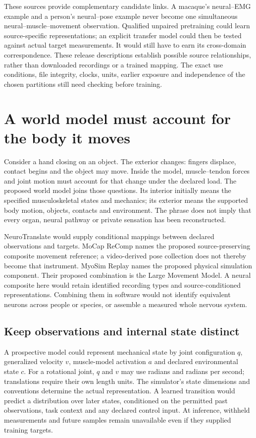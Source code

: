 These sources provide complementary candidate links. A macaque's neural--EMG example and a person's neural--pose example never become one simultaneous neural--muscle--movement observation. Qualified unpaired pretraining could learn source-specific representations; an explicit transfer model could then be tested against actual target measurements. It would still have to earn its cross-domain correspondence. These release descriptions establish possible source relationships, rather than downloaded recordings or a trained mapping. The exact use conditions, file integrity, clocks, units, earlier exposure and independence of the chosen partitions still need checking before training.

\section{A world model must account for the body it moves}

Consider a hand closing on an object. The exterior changes: fingers displace, contact begins and the object may move. Inside the model, muscle--tendon forces and joint motion must account for that change under the declared load. The proposed world model joins those questions. Its interior initially means the specified musculoskeletal states and mechanics; its exterior means the supported body motion, objects, contacts and environment. The phrase does not imply that every organ, neural pathway or private sensation has been reconstructed.

NeuroTranslate would supply conditional mappings between declared observations and targets. MoCap ReComp names the proposed source-preserving composite movement reference; a video-derived pose collection does not thereby become that instrument. MyoSim Replay names the proposed physical simulation component. Their proposed combination is the Large Movement Model. A neural composite here would retain identified recording types and source-conditioned representations. Combining them in software would not identify equivalent neurons across people or species, or assemble a measured whole nervous system.

\subsection{Keep observations and internal state distinct}

A prospective model could represent mechanical state by joint configuration $q$, generalized velocity $v$, muscle-model activation $a$ and declared environmental state $c$. For a rotational joint, $q$ and $v$ may use radians and radians per second; translations require their own length units. The simulator's state dimensions and conventions determine the actual representation. A learned transition would predict a distribution over later states, conditioned on the permitted past observations, task context and any declared control input. At inference, withheld measurements and future samples remain unavailable even if they supplied training targets.

